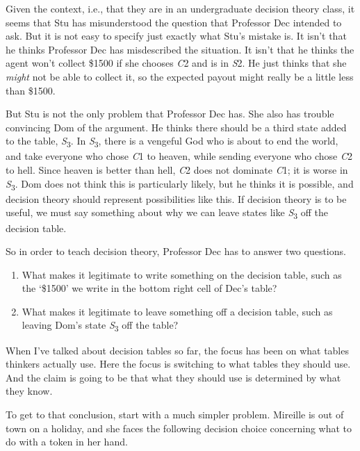 \documentclass[
  11pt,
]{book}
\providecommand{\tightlist}{%
  \setlength{\itemsep}{0pt}\setlength{\parskip}{0pt}}
\begin{document}
Given the context, i.e., that they are in an undergraduate decision theory class, it seems that Stu has misunderstood the question that Professor Dec intended to ask. But it is not easy to specify just exactly what Stu's mistake is. It isn't that he thinks Professor Dec has misdescribed the situation. It isn't that he thinks the agent won't collect \$1500 if she chooses \emph{C}2 and is in \emph{S}2. He just thinks that she \emph{might} not be able to collect it, so the expected payout might really be a little less than \$1500.

But Stu is not the only problem that Professor Dec has. She also has trouble convincing Dom of the argument. He thinks there should be a third state added to the table, \emph{S}\textsubscript{3}. In \emph{S}\textsubscript{3}, there is a vengeful God who is about to end the world, and take everyone who chose \emph{C}1 to heaven, while sending everyone who chose \emph{C}2 to hell. Since heaven is better than hell, \emph{C}2 does not dominate \emph{C}1; it is worse in \emph{S}\textsubscript{3}. Dom does not think this is particularly likely, but he thinks it is possible, and decision theory should represent possibilities like this. If decision theory is to be useful, we must say something about why we can leave states like \emph{S}\textsubscript{3} off the decision table.

So in order to teach decision theory, Professor Dec has to answer two questions.

\begin{enumerate}
\def\labelenumi{\arabic{enumi}.}
\tightlist
\item
  What makes it legitimate to write something on the decision table, such as the `\$1500' we write in the bottom right cell of Dec's table?
\item
  What makes it legitimate to leave something off a decision table, such as leaving Dom's state \emph{S}\textsubscript{3} off the table?
\end{enumerate}

When I've talked about decision tables so far, the focus has been on what tables thinkers actually use. Here the focus is switching to what tables they should use. And the claim is going to be that what they should use is determined by what they know.

To get to that conclusion, start with a much simpler problem. Mireille is out of town on a holiday, and she faces the following decision choice concerning what to do with a token in her hand.
\end{document}
